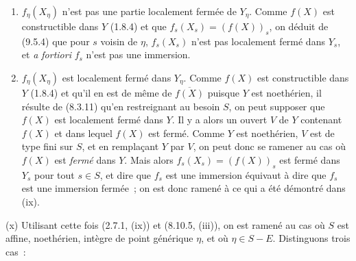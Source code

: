 \begin{enumerate}[label=\upshape{$\arabic{enumi}^\circ$}]
  \item $f_\eta(X_\eta)$ n'est pas une partie localement fermée de $Y_\eta$.
  Comme $f(X)$ est constructible dans $Y$ (1.8.4) et que
  $f_s(X_s)=(f(X))_s$, on déduit de (9.5.4) que pour $s$ voisin de $\eta$,
  $f_s(X_s)$ n'est pas localement fermé dans $Y_s$, et \emph{a fortiori}
  $f_s$ n'est pas une immersion.

  \item{} $f_\eta(X_\eta)$ est localement fermé dans $Y_\eta$.
  Comme $f(X)$ est constructible dans $Y$ (1.8.4) et qu'il en est de même de
  $\overline{f(X)}$ puisque $Y$ est noethérien, il résulte de (8.3.11) qu'en
  restreignant au besoin $S$, on peut supposer que $f(X)$ est localement fermé
  dans $Y$. Il y a alors un ouvert $V$ de $Y$ contenant $f(X)$ et dans lequel
  $f(X)$ est fermé. Comme $Y$ est noethérien, $V$ est de type fini sur $S$, et
  en remplaçant $Y$ par $V$, on peut donc se ramener au cas où $f(X)$ est
  \emph{fermé} dans $Y$. Mais alors $f_s(X_s)=(f(X))_s$ est fermé dans $Y_s$
  pour tout $s\in S$, et dire que $f_s$ est une immersion équivaut à dire que
  $f_s$ est une immersion fermée~; on est donc ramené à ce qui a été démontré
  dans (ix).
\end{enumerate}

(x) Utilisant cette fois (2.7.1, (ix)) et (8.10.5, (iii)), on est ramené au cas
où $S$ est affine, noethérien, intègre de point générique $\eta$, et où
$\eta\in S-E$. Distinguons trois cas~:

